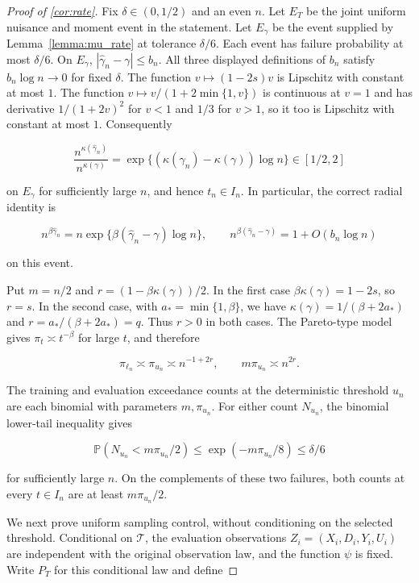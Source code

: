 \documentclass[12pt]{article}
\theoremstyle{plain}
\theoremstyle{definition}
\begin{document}
\begin{proof}[Proof of \cref{cor:rate}]
Fix $\delta\in(0,1/2)$ and an even $n$. Let $E_T$ be the joint uniform nuisance and moment event in the statement. Let $E_\gamma$ be the event supplied by Lemma~\ref{lemma:mu_rate} at tolerance $\delta/6$. Each event has failure probability at most $\delta/6$. On $E_\gamma$, $|\hat\gamma_n-\gamma|\leq b_n$. All three displayed definitions of $b_n$ satisfy $b_n\log n\to0$ for fixed $\delta$. The function $v\mapsto(1-2s)v$ is Lipschitz with constant at most $1$. The function $v\mapsto v/(1+2\min\{1,v\})$ is continuous at $v=1$ and has derivative $1/(1+2v)^2$ for $v<1$ and $1/3$ for $v>1$, so it too is Lipschitz with constant at most $1$. Consequently

\[
\frac{n^{\kappa(\hat\gamma_n)}}{n^{\kappa(\gamma)}}=\exp\{(\kappa(\hat\gamma_n)-\kappa(\gamma))\log n\}\in[1/2,2]
\]

on $E_\gamma$ for sufficiently large $n$, and hence $t_n\in I_n$. In particular, the correct radial identity is

\[
n^{\beta\hat\gamma_n}=n\exp\{\beta(\hat\gamma_n-\gamma)\log n\},\qquad n^{\beta(\hat\gamma_n-\gamma)}=1+O(b_n\log n)
\]

on this event. 

Put $m=n/2$ and $r=(1-\beta\kappa(\gamma))/2$. In the first case $\beta\kappa(\gamma)=1-2s$, so $r=s$. In the second case, with $a_* =\min\{1,\beta\}$, we have $\kappa(\gamma)=1/(\beta+2a_*)$ and $r=a_*/(\beta+2a_*)=q$. Thus $r>0$ in both cases. The Pareto-type model gives $\pi_t\asymp t^{-\beta}$ for large $t$, and therefore

\[
\pi_{\ell_n}\asymp\pi_{u_n}\asymp n^{-1+2r},\qquad m\pi_{u_n}\asymp n^{2r}.
\]

The training and evaluation exceedance counts at the deterministic threshold $u_n$ are each binomial with parameters $m,\pi_{u_n}$. For either count $N_{u_n}$, the binomial lower-tail inequality gives

\[
\mathbb P(N_{u_n}<m\pi_{u_n}/2)\leq\exp(-m\pi_{u_n}/8)\leq\delta/6
\]

for sufficiently large $n$. On the complements of these two failures, both counts at every $t\in I_n$ are at least $m\pi_{u_n}/2$. 

We next prove uniform sampling control, without conditioning on the selected threshold. Conditional on $\mathcal T$, the evaluation observations $Z_i=(X_i,D_i,Y_i,U_i)$ are independent with the original observation law, and the function $\psi$ is fixed. Write $P_T$ for this conditional law and define


\end{proof}
\end{document}
